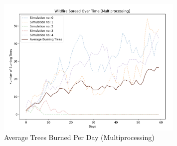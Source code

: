 \documentclass[a4paper,12pt]{article}
\begin{document}
\begin{figure}[H]
  \centering
  \includegraphics[width=0.8\textwidth]{../images/a4_ex1_multiprocessing_example.png}
  \caption{Average Trees Burned Per Day (Multiprocessing)}
\end{figure}
\end{document}
